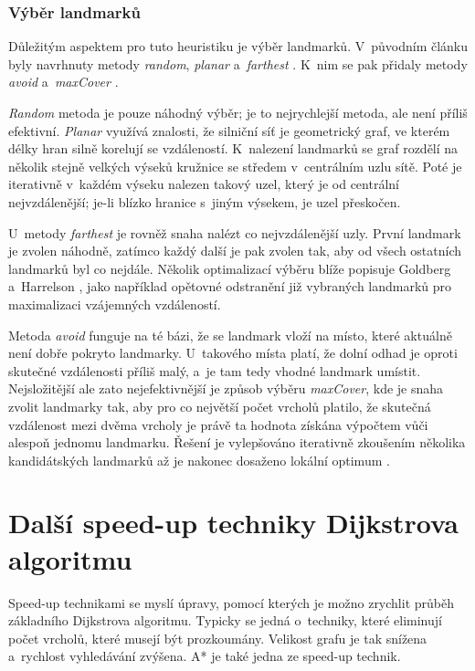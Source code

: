 \subsubsection{Výběr landmarků}
Důležitým aspektem pro tuto heuristiku je výběr landmarků. V~původním článku byly navrhnuty metody \textit{random}, \textit{planar} a~\textit{farthest} \cite{goldberg03AMeetsGT}. K~nim se pak přidaly metody \textit{avoid} a~\textit{maxCover} \cite{goldberg05PointToPoint}.

\textit{Random} metoda je pouze náhodný výběr; je to nejrychlejší metoda, ale není příliš efektivní. \textit{Planar} využívá znalosti, že silniční síť je geometrický graf, ve kterém délky hran silně korelují se vzdáleností. K~nalezení landmarků se graf rozdělí na několik stejně velkých výseků kružnice se středem v~centrálním uzlu sítě. Poté je iterativně v~každém výseku nalezen takový uzel, který je od centrální nejvzdálenější; je-li blízko hranice s~jiným výsekem, je uzel přeskočen.

U~metody \textit{farthest} je rovněž snaha nalézt co nejvzdálenější uzly. První landmark je zvolen náhodně, zatímco každý další je pak zvolen tak, aby od všech ostatních landmarků byl co nejdále. Několik optimalizací výběru blíže popisuje Goldberg a~Harrelson \cite{goldberg03AMeetsGT}, jako například opětovné odstranění již vybraných landmarků pro maximalizaci vzájemných vzdáleností.

Metoda \textit{avoid} funguje na té bázi, že se landmark vloží na místo, které aktuálně není dobře pokryto landmarky. U~takového místa platí, že dolní odhad je oproti skutečné vzdálenosti příliš malý, a~je tam tedy vhodné landmark umístit. Nejsložitější ale zato nejefektivnější je způsob výběru \textit{maxCover}, kde je snaha zvolit landmarky tak, aby pro co největší počet vrcholů platilo, že skutečná vzdálenost mezi dvěma vrcholy je právě ta hodnota získána výpočtem vůči alespoň jednomu landmarku. Řešení je vylepšováno iterativně zkoušením několika kandidátských landmarků až je nakonec dosaženo lokální optimum \cite{goldberg05PointToPoint}.

\section{Další speed-up techniky Dijkstrova algoritmu}
Speed-up technikami se myslí úpravy, pomocí kterých je možno zrychlit průběh základního Dijkstrova algoritmu. Typicky se jedná o~techniky, které eliminují počet vrcholů, které musejí být prozkoumány. Velikost grafu je tak snížena a~rychlost vyhledávání zvýšena. A* je také jedna ze speed-up technik.

